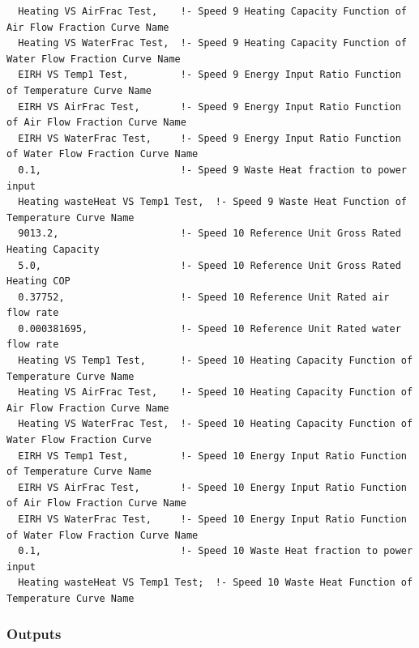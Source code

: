 \begin{lstlisting}
  Heating VS AirFrac Test,    !- Speed 9 Heating Capacity Function of Air Flow Fraction Curve Name
  Heating VS WaterFrac Test,  !- Speed 9 Heating Capacity Function of Water Flow Fraction Curve Name
  EIRH VS Temp1 Test,         !- Speed 9 Energy Input Ratio Function of Temperature Curve Name
  EIRH VS AirFrac Test,       !- Speed 9 Energy Input Ratio Function of Air Flow Fraction Curve Name
  EIRH VS WaterFrac Test,     !- Speed 9 Energy Input Ratio Function of Water Flow Fraction Curve Name
  0.1,                        !- Speed 9 Waste Heat fraction to power input
  Heating wasteHeat VS Temp1 Test,  !- Speed 9 Waste Heat Function of Temperature Curve Name
  9013.2,                     !- Speed 10 Reference Unit Gross Rated Heating Capacity
  5.0,                        !- Speed 10 Reference Unit Gross Rated Heating COP
  0.37752,                    !- Speed 10 Reference Unit Rated air flow rate
  0.000381695,                !- Speed 10 Reference Unit Rated water flow rate
  Heating VS Temp1 Test,      !- Speed 10 Heating Capacity Function of Temperature Curve Name
  Heating VS AirFrac Test,    !- Speed 10 Heating Capacity Function of Air Flow Fraction Curve Name
  Heating VS WaterFrac Test,  !- Speed 10 Heating Capacity Function of Water Flow Fraction Curve
  EIRH VS Temp1 Test,         !- Speed 10 Energy Input Ratio Function of Temperature Curve Name
  EIRH VS AirFrac Test,       !- Speed 10 Energy Input Ratio Function of Air Flow Fraction Curve Name
  EIRH VS WaterFrac Test,     !- Speed 10 Energy Input Ratio Function of Water Flow Fraction Curve Name
  0.1,                        !- Speed 10 Waste Heat fraction to power input
  Heating wasteHeat VS Temp1 Test;  !- Speed 10 Waste Heat Function of Temperature Curve Name
\end{lstlisting}

\subsubsection{Outputs}\label{outputs-28}

